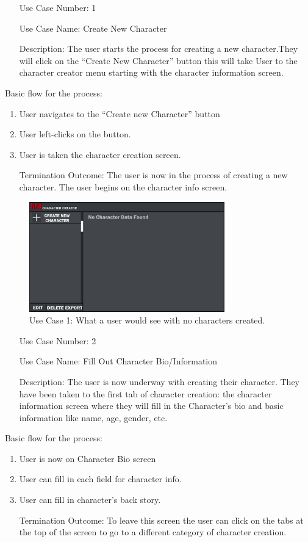 \documentclass[10pt,conference,onecolumn,compsoc]{IEEEtran}
\begin{document}
\begin{itemize}
\item[Use Case Number:] 1
\item[Use Case Name:] Create New Character
\item[Description:] The user starts the process for creating a new character.They will click on the “Create New Character” button this will take User to the character creator menu starting with the character information screen. 
\end{itemize}

Basic flow for the process:

\begin{enumerate}
\item User navigates to the “Create new Character” button
\item User left-clicks on the button.
\item User is taken the character creation screen.
\item[Termination Outcome:] The user is now in the process of creating a new character. The user begins on the character info screen.
\end{enumerate}

\begin{figure}[ht!]
\includegraphics[height=180px, width=320px]{CSCI 352 Interface Mockups/Interface Mockup 0.5.png}
\caption{Use Case 1: What a user would see with no characters created.}
\centering
\label{mockup0.5}
\end{figure}

\begin{itemize}
\item[Use Case Number:] 2
\item[Use Case Name:] Fill Out Character Bio/Information
\item[Description:] The user is now underway with creating their character. They have been taken to the first tab of character creation: the character information screen where they will fill in the Character's bio and basic information like name, age, gender, etc.
\end{itemize}
Basic flow for the process:
\begin{enumerate}
\item User is now on Character Bio screen
\item User can fill in each field for character info.
\item User can fill in character's back story.
\item[Termination Outcome:] To leave this screen the user can click on the tabs at the top of the screen to go to a different category of character creation.
\end{enumerate}
\end{document}
